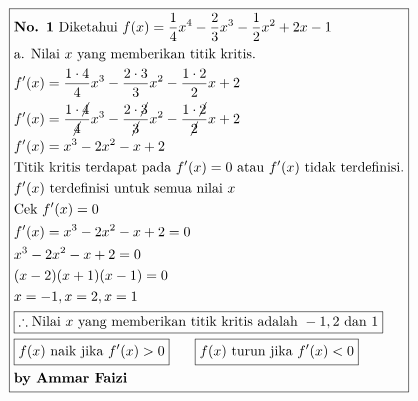 \documentclass[13pt]{article}
\begin{document}
\par\noindent
\begin{fleqn}[4em]

\begin{align*}
\boxed{\begin{aligned}
  & \textbf{No. 1} \text{ Diketahui }
    f(x) = \frac{1}{4} x^4 - \frac{2}{3} x^3 - \frac{1}{2} x^2 + 2x - 1 \\
  & \text{a. Nilai } x \text{ yang memberikan titik kritis.} \\
  & f'(x) = \frac{1 \cdot 4}{4} x^3 - \frac{2 \cdot 3}{3} x^2 - \frac{1 \cdot 2}{2} x + 2 \\
  & f'(x) = \frac{1 \cdot \cancel{4}}{\cancel{4}} x^3 - \frac{2 \cdot \cancel{3}}{\cancel{3}} x^2 - \frac{1 \cdot \cancel{2}}{\cancel{2}} x + 2 \\
  & f'(x) = x^3 - 2x^2 - x + 2 \\
  & \text{Titik kritis terdapat pada } f'(x) = 0 \text{ atau } f'(x) \text{ tidak terdefinisi.} \\
  & f'(x) \text{ terdefinisi untuk semua nilai } x \\
  & \text{Cek } f'(x) = 0 \\
  & f'(x) = x^3 - 2x^2 - x + 2 = 0 \\
  & x^3 - 2x^2 - x + 2 = 0 \\
  & (x - 2)(x + 1)(x - 1) = 0 \\
  & x = -1, x = 2, x = 1 \\
  & \boxed{\therefore \text{Nilai } x \text{ yang memberikan titik kritis adalah } -1, 2 \text{ dan } 1} \\
  & \boxed{\begin{aligned}
    & f(x) \text{ naik jika } f'(x) > 0 \\
    \end{aligned}}\;~\;~\;~
    \boxed{\begin{aligned}
    & f(x) \text{ turun jika } f'(x) < 0\\
    \end{aligned}}
  \\ & \textbf{by Ammar Faizi}
\end{aligned}}
\end{align*}

\end{fleqn}
\end{document}
